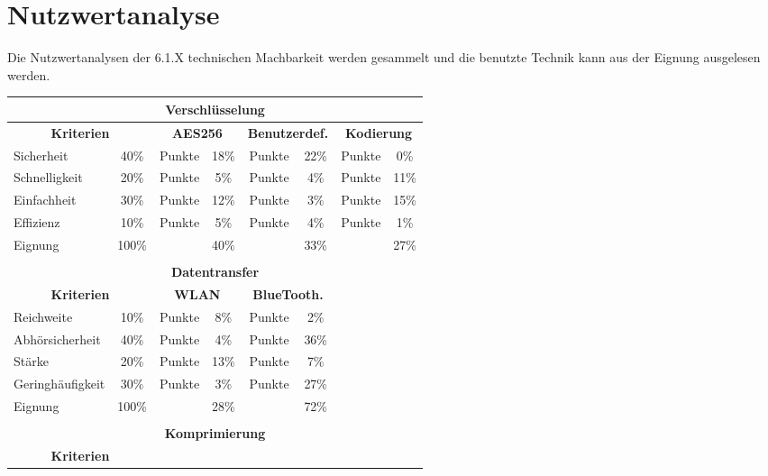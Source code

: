 \newpage
\section{Nutzwertanalyse}
Die Nutzwertanalysen der 6.1.X technischen Machbarkeit werden gesammelt und die benutzte Technik kann aus der Eignung ausgelesen werden.
\begin{table}[H]
	\begin{center}
		\begin{tabularx} {\linewidth}{|X|c|c|c|c|c|c|c|}
			\multicolumn{8}{c}{\textbf{Verschlüsselung}}\\
			\hline
			\multicolumn{2}{|c|}{\textbf{Kriterien}} & 
			\multicolumn{2}{c|}{\textbf{AES256}} &
			\multicolumn{2}{c|}{\textbf{Benutzerdef.}} & 
			\multicolumn{2}{c|}{\textbf{Kodierung}} \\
			\hline
			Sicherheit & 40\% & Punkte & 18\% & Punkte & 22\% & Punkte & 0\% \\
			\hline
			Schnelligkeit & 20\% & Punkte & 5\% & Punkte & 4\% & Punkte & 11\% \\
			\hline
			Einfachheit & 30\% & Punkte & 12\% & Punkte & 3\% & Punkte & 15\% \\
			\hline
			Effizienz & 10\% & Punkte & 5\% & Punkte & 4\% & Punkte & 1\% \\
			\hline
			Eignung & 100\% &  & 40\% &  & 33\% &  & 27\% \\
			\cline{1-2}\cline{4-4}\cline{6-6}\cline{8-8}
			\multicolumn{8}{c}{}\\
			\multicolumn{8}{c}{\textbf{Datentransfer}}\\
			\cline{1-6}
			\multicolumn{2}{|c|}{\textbf{Kriterien}} & 
			\multicolumn{2}{c|}{\textbf{WLAN}} &
			\multicolumn{2}{c|}{\textbf{BlueTooth.}} \\
			\cline{1-6}
			Reichweite & 10\% & Punkte & 8\% & Punkte & 2\% \\
			\cline{1-6}
			Abhörsicherheit & 40\% & Punkte & 4\% & Punkte & 36\% \\
			\cline{1-6}
			Stärke & 20\% & Punkte & 13\% & Punkte & 7\%  \\
			\cline{1-6}
			Geringhäufigkeit & 30\% & Punkte & 3\% & Punkte & 27\%  \\
			\cline{1-6}
			Eignung & 100\% &  & 28\% &  & 72\%\\
			\cline{1-2}
			\cline{4-4}
			\cline{6-6}
			\multicolumn{8}{c}{}\\
			\multicolumn{8}{c}{\textbf{Komprimierung}}\\
			\hline
			\multicolumn{2}{|c|}{\textbf{Kriterien}} & 

\end{tabularx}
\end{center}
\end{table}
